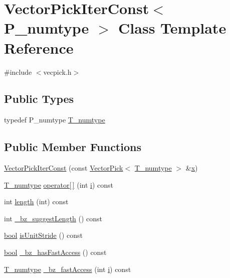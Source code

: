 \hypertarget{classVectorPickIterConst}{}\section{Vector\+Pick\+Iter\+Const$<$ P\+\_\+numtype $>$ Class Template Reference}
\label{classVectorPickIterConst}


{\ttfamily \#include $<$vecpick.\+h$>$}

\subsection*{Public Types}
\begin{DoxyCompactItemize}
\item 
typedef P\+\_\+numtype \hyperlink{classVectorPickIterConst_a598ff8242bb68fb7f4cfb38666977a37}{T\+\_\+numtype}
\end{DoxyCompactItemize}
\subsection*{Public Member Functions}
\begin{DoxyCompactItemize}
\item 
\hyperlink{classVectorPickIterConst_aeff39b18bf83fb845f14687d95b0f146}{Vector\+Pick\+Iter\+Const} (const \hyperlink{classVectorPick}{Vector\+Pick}$<$ \hyperlink{classVectorPickIterConst_a598ff8242bb68fb7f4cfb38666977a37}{T\+\_\+numtype} $>$ \&\hyperlink{vecnorm1_8cc_ac73eed9e41ec09d58f112f06c2d6cb63}{x})
\item 
\hyperlink{classVectorPickIterConst_a598ff8242bb68fb7f4cfb38666977a37}{T\+\_\+numtype} \hyperlink{classVectorPickIterConst_a7a69180e91b3b6fa4848ad88e9a47e6e}{operator\mbox{[}$\,$\mbox{]}} (int \hyperlink{indexexpr_8h_aabd77643995707c185e95c8cb2782c81}{i}) const 
\item 
int \hyperlink{classVectorPickIterConst_afb8b76bdcd70d890fa825ecd000badca}{length} (int) const 
\item 
int \hyperlink{classVectorPickIterConst_ac50f48aed70f27d448bdcd3940d37296}{\+\_\+bz\+\_\+suggest\+Length} () const 
\item 
\hyperlink{compiler_8h_abb452686968e48b67397da5f97445f5b}{bool} \hyperlink{classVectorPickIterConst_a894a20d7c4e67048e12a68cfb17f8cb8}{is\+Unit\+Stride} () const 
\item 
\hyperlink{compiler_8h_abb452686968e48b67397da5f97445f5b}{bool} \hyperlink{classVectorPickIterConst_a8755cbff6b4e5ccef6fe8d9d482d4196}{\+\_\+bz\+\_\+has\+Fast\+Access} () const 
\item 
\hyperlink{classVectorPickIterConst_a598ff8242bb68fb7f4cfb38666977a37}{T\+\_\+numtype} \hyperlink{classVectorPickIterConst_a29f2c1757118a2c4f3f6f007ad3d0a41}{\+\_\+bz\+\_\+fast\+Access} (int \hyperlink{indexexpr_8h_aabd77643995707c185e95c8cb2782c81}{i}) const 
\end{DoxyCompactItemize}
